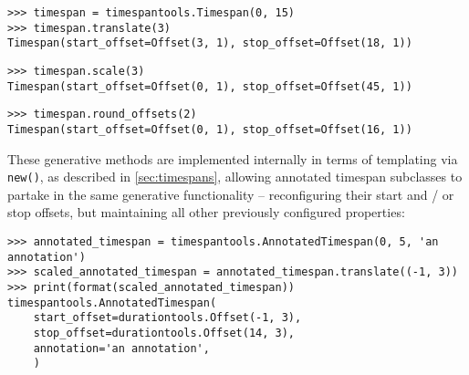 \begin{abjadbookoutput}
\begin{singlespacing}
\vspace{-0.5\baselineskip}
\begin{verbatim}
>>> timespan = timespantools.Timespan(0, 15)
>>> timespan.translate(3)
Timespan(start_offset=Offset(3, 1), stop_offset=Offset(18, 1))
\end{verbatim}
\begin{verbatim}
>>> timespan.scale(3)
Timespan(start_offset=Offset(0, 1), stop_offset=Offset(45, 1))
\end{verbatim}
\begin{verbatim}
>>> timespan.round_offsets(2)
Timespan(start_offset=Offset(0, 1), stop_offset=Offset(16, 1))
\end{verbatim}
\end{singlespacing}
\end{abjadbookoutput}

\noindent These generative methods are implemented internally in terms of
templating via \texttt{new()}, as described in \autoref{sec:timespans},
allowing annotated timespan subclasses to partake in the same generative
functionality -- reconfiguring their start and / or stop offsets, but
maintaining all other previously configured properties:

\begin{comment}
<abjad>
annotated_timespan = timespantools.AnnotatedTimespan(0, 5, 'an annotation')
scaled_annotated_timespan = annotated_timespan.translate((-1, 3))
print(format(scaled_annotated_timespan))
</abjad>
\end{comment}

\begin{abjadbookoutput}
\begin{singlespacing}
\vspace{-0.5\baselineskip}
\begin{verbatim}
>>> annotated_timespan = timespantools.AnnotatedTimespan(0, 5, 'an annotation')
>>> scaled_annotated_timespan = annotated_timespan.translate((-1, 3))
>>> print(format(scaled_annotated_timespan))
timespantools.AnnotatedTimespan(
    start_offset=durationtools.Offset(-1, 3),
    stop_offset=durationtools.Offset(14, 3),
    annotation='an annotation',
    )
\end{verbatim}
\end{singlespacing}
\end{abjadbookoutput}


